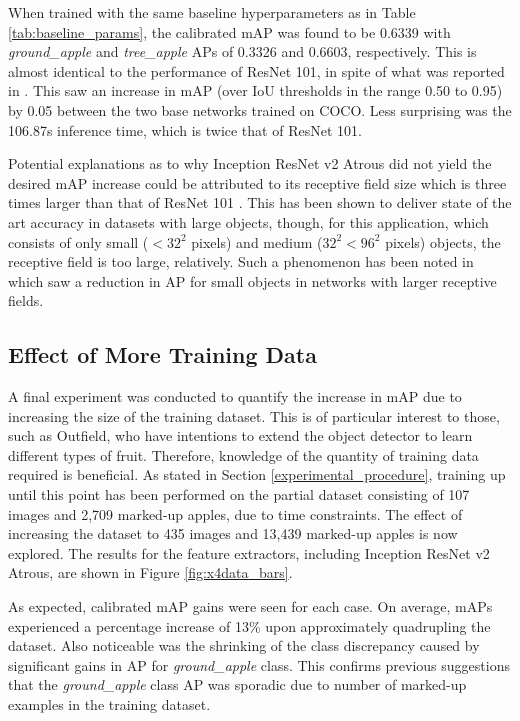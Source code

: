 \documentclass[journal]{IEEEtran}
\begin{document}
When trained with the same baseline hyperparameters as in Table \ref{tab:baseline_params}, the calibrated mAP was found to be 0.6339 with \textit{ground\_apple} and \textit{tree\_apple} APs of 0.3326 and 0.6603, respectively. This is almost identical to the performance of ResNet 101, in spite of what was reported in \cite{modelzoo}. This saw an increase in mAP (over IoU thresholds in the range 0.50 to 0.95) by 0.05 between the two base networks trained on COCO. Less surprising was the 106.87s inference time, which is twice that of ResNet 101.

Potential explanations as to why Inception ResNet v2 Atrous did not yield the desired mAP increase could be attributed to its receptive field size which is three times larger than that of ResNet 101 \cite{inceptionresnet}. This has been shown to deliver state of the art accuracy in datasets with large objects, though, for this application, which consists of only small ($<32^2$ pixels) and medium ($32^2<96^2$ pixels) objects, the receptive field is too large, relatively. Such a phenomenon has been noted in \cite{receptivefield} which saw a reduction in AP for small objects in networks with larger receptive fields.








\subsection{Effect of More Training Data}

A final experiment was conducted to quantify the increase in mAP due to increasing the size of the training dataset. This is of particular interest to those, such as Outfield, who have intentions to extend the object detector to learn different types of fruit. Therefore, knowledge of the quantity of training data required is beneficial.
As stated in Section \ref{experimental_procedure}, training up until this point has been performed on the partial dataset consisting of 107 images and 2,709 marked-up apples, due to time constraints. The effect of increasing the dataset to 435 images and 13,439 marked-up apples is now explored. The results for the feature extractors, including Inception ResNet v2 Atrous, are shown in Figure \ref{fig:x4data_bars}.


As expected, calibrated mAP gains were seen for each case. On average, mAPs experienced a percentage increase of 13\% upon approximately quadrupling the dataset. Also noticeable was the shrinking of the class discrepancy caused by significant gains in AP for \textit{ground\_apple} class. This confirms previous suggestions that the \textit{ground\_apple} class AP was sporadic due to number of marked-up examples in the training dataset.
\end{document}
